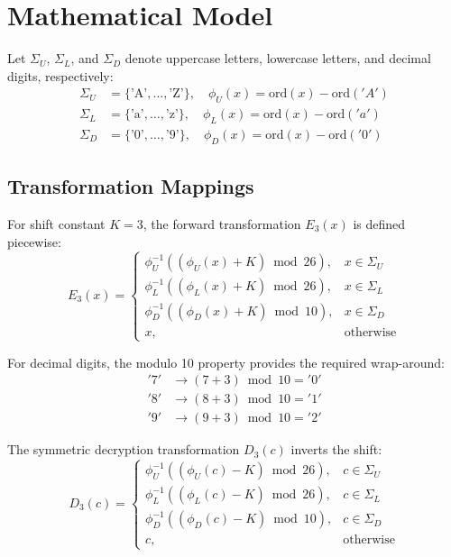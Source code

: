 \documentclass[11pt,a4paper]{article}
\begin{document}
\section{Mathematical Model}
Let $\Sigma_U$, $\Sigma_L$, and $\Sigma_D$ denote uppercase letters, lowercase letters, and decimal digits, respectively:
\begin{align}
    \Sigma_U &= \{\text{'A'}, \dots, \text{'Z'}\}, \quad \phi_U(x) = \text{ord}(x) - \text{ord}('A') \\
    \Sigma_L &= \{\text{'a'}, \dots, \text{'z'}\}, \quad \phi_L(x) = \text{ord}(x) - \text{ord}('a') \\
    \Sigma_D &= \{\text{'0'}, \dots, \text{'9'}\}, \quad \phi_D(x) = \text{ord}(x) - \text{ord}('0')
\end{align}

\subsection{Transformation Mappings}
For shift constant $K = 3$, the forward transformation $E_3(x)$ is defined piecewise:
\begin{equation}
    E_3(x) =
    \begin{cases}
        \phi_U^{-1}\left( (\phi_U(x) + K) \bmod 26 \right), & x \in \Sigma_U \\
        \phi_L^{-1}\left( (\phi_L(x) + K) \bmod 26 \right), & x \in \Sigma_L \\
        \phi_D^{-1}\left( (\phi_D(x) + K) \bmod 10 \right), & x \in \Sigma_D \\
        x, & \text{otherwise}
    \end{cases}
\end{equation}

For decimal digits, the modulo 10 property provides the required wrap-around:
\begin{align*}
    '7' &\to (7 + 3) \bmod 10 = '0' \\
    '8' &\to (8 + 3) \bmod 10 = '1' \\
    '9' &\to (9 + 3) \bmod 10 = '2'
\end{align*}

The symmetric decryption transformation $D_3(c)$ inverts the shift:
\begin{equation}
    D_3(c) =
    \begin{cases}
        \phi_U^{-1}\left( (\phi_U(c) - K) \bmod 26 \right), & c \in \Sigma_U \\
        \phi_L^{-1}\left( (\phi_L(c) - K) \bmod 26 \right), & c \in \Sigma_L \\
        \phi_D^{-1}\left( (\phi_D(c) - K) \bmod 10 \right), & c \in \Sigma_D \\
        c, & \text{otherwise}
    \end{cases}
\end{equation}
\end{document}
